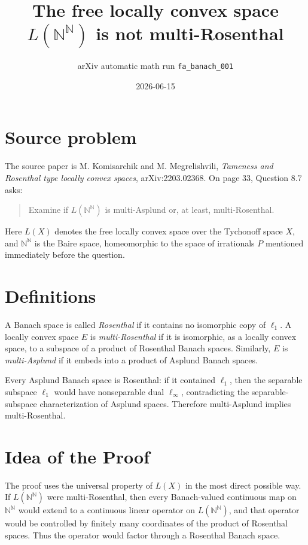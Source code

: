 \documentclass[11pt]{article}
\title{The free locally convex space \(L(\mathbb N^\mathbb N)\) is not multi-Rosenthal}
\author{arXiv automatic math run \texttt{fa\_banach\_001}}
\date{2026-06-15}
\newcommand{\N}{\mathbb{N}}
\newcommand{\NN}{\N^\N}
\begin{document}
\maketitle

\section*{Source problem}

The source paper is M. Komisarchik and M. Megrelishvili,
\emph{Tameness and Rosenthal type locally convex spaces},
arXiv:2203.02368.  On page 33, Question 8.7 asks:

\begin{quote}
Examine if \(L(\mathbb N^{\mathbb N})\) is multi-Asplund or, at least, multi-Rosenthal.
\end{quote}

Here \(L(X)\) denotes the free locally convex space over the Tychonoff space
\(X\), and \(\mathbb N^{\mathbb N}\) is the Baire space, homeomorphic to the
space of irrationals \(P\) mentioned immediately before the question.

\section*{Definitions}

A Banach space is called \emph{Rosenthal} if it contains no isomorphic copy of
\(\ell_1\).  A locally convex space \(E\) is \emph{multi-Rosenthal} if it is
isomorphic, as a locally convex space, to a subspace of a product of Rosenthal
Banach spaces.  Similarly, \(E\) is \emph{multi-Asplund} if it embeds into a
product of Asplund Banach spaces.

Every Asplund Banach space is Rosenthal: if it contained \(\ell_1\), then the
separable subspace \(\ell_1\) would have nonseparable dual \(\ell_\infty\),
contradicting the separable-subspace characterization of Asplund spaces.
Therefore multi-Asplund implies multi-Rosenthal.

\section*{Idea of the Proof}

The proof uses the universal property of \(L(X)\) in the most direct possible
way.  If \(L(\NN)\) were multi-Rosenthal, then every Banach-valued continuous
map on \(\NN\) would extend to a continuous linear operator on \(L(\NN)\), and
that operator would be controlled by finitely many coordinates of the product
of Rosenthal spaces.  Thus the operator would factor through a Rosenthal Banach
space.
\end{document}
